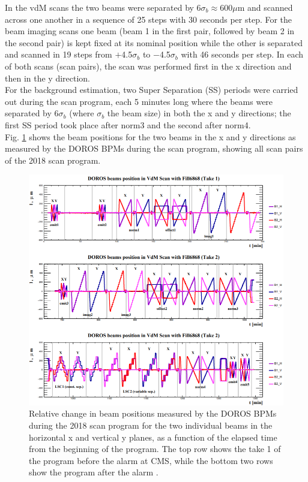 In the vdM scans the two beams were separated by $6 \sigma_{b} \approx 600 \mu$m and scanned across one another in a sequence of 25 steps with 30 seconds per step. For the beam imaging scans  one beam (beam 1 in the first pair, followed by beam 2 in the second pair) is kept fixed at its nominal position while the other is separated and scanned in 19 steps from  $+$4.5$\sigma_{b}$ to $-$4.5$\sigma_{b}$ with 46 seconds per step. In each of both scans (scan  pairs), the scan was performed first in the x direction and then in the y direction. \\For the background estimation, two Super Separation (SS) periods were carried out during the scan program, each 5 minutes long where the beams were separated by $6\sigma_{b}$ (where $\sigma_{b}$ the beam size) in both the x and y directions; the first SS period took place after norm3 and the second after norm4.\\
Fig. \ref{scan_prog} shows the beam positions for the two beams in the x and y directions as measured by the DOROS BPMs during the scan program, showing all scan pairs of the 2018 scan program.

\begin{center}
  \begin{figure}[ht]
    \centering
    \includegraphics[scale=.45]{Chapter3/2018Scanprogram.png}
    \caption[2018 scan program]{Relative change in beam positions measured by the DOROS BPMs during the 2018 scan program for the two individual beams in the horizontal x and vertical y planes, as a function of the elapsed time from the beginning of the program. The top row shows the take 1 of the program before the alarm at CMS, while the bottom two rows show the program after the alarm \cite{pas_18}.}
    \label{scan_prog}
  \end{figure}
\end{center}

